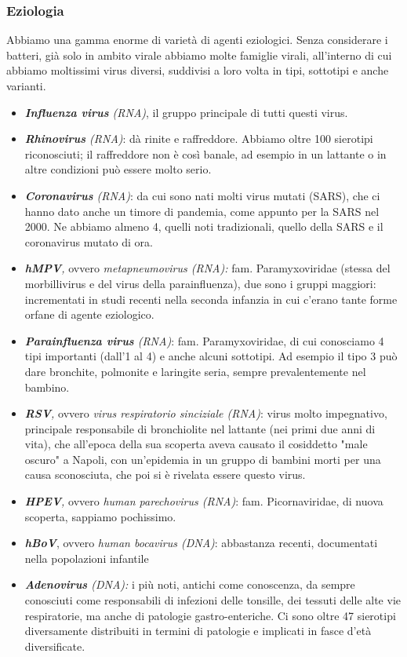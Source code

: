 \subsubsection{Eziologia}

  Abbiamo una gamma enorme di varietà di agenti eziologici. Senza
  considerare i batteri, già solo in ambito virale abbiamo molte
  famiglie virali, all'interno di cui abbiamo moltissimi virus diversi,
  suddivisi a loro volta in tipi, sottotipi e anche varianti.

\begin{itemize}
\item
  \emph{\textbf{Influenza virus} (RNA)}, il gruppo principale di tutti
  questi virus.
\item
  \emph{\textbf{Rhinovirus} (RNA)}: dà rinite e raffreddore. Abbiamo
  oltre 100 sierotipi riconosciuti; il raffreddore non è così banale, ad
  esempio in un lattante o in altre condizioni può essere molto serio.
\item
  \emph{\textbf{Coronavirus} (RNA)}: da cui sono nati molti virus mutati
  (SARS), che ci hanno dato anche un timore di pandemia, come appunto
  per la SARS nel 2000. Ne abbiamo almeno 4, quelli noti tradizionali,
  quello della SARS e il coronavirus mutato di ora.
\item
  \emph{\textbf{hMPV},} ovvero \emph{metapneumovirus (RNA):} fam.
  Paramyxoviridae (stessa del morbillivirus e del virus della
  parainfluenza), due sono i gruppi maggiori: incrementati in studi
  recenti nella seconda infanzia in cui c'erano tante forme orfane di
  agente eziologico.
\item
  \emph{\textbf{Parainfluenza virus} (RNA)}: fam. Paramyxoviridae, di
  cui conosciamo 4 tipi importanti (dall'1 al 4) e anche alcuni
  sottotipi. Ad esempio il tipo 3 può dare bronchite, polmonite e
  laringite seria, sempre prevalentemente nel bambino.
\item
  \emph{\textbf{RSV},} ovvero \emph{virus respiratorio sinciziale
  (RNA)}: virus molto impegnativo, principale responsabile di
  bronchiolite nel lattante (nei primi due anni di vita), che all'epoca
  della sua scoperta aveva causato il cosiddetto "male oscuro" a Napoli,
  con un'epidemia in un gruppo di bambini morti per una causa
  sconosciuta, che poi si è rivelata essere questo virus.
\item
  \emph{\textbf{HPEV},} ovvero \emph{human parechovirus (RNA)}: fam.
  Picornaviridae, di nuova scoperta, sappiamo pochissimo.
\item
  \emph{\textbf{hBoV}}, ovvero \emph{human bocavirus (DNA)}: abbastanza
  recenti, documentati nella popolazioni infantile
\item
  \emph{\textbf{Adenovirus} (DNA):} i più noti, antichi come conoscenza,
  da sempre conosciuti come responsabili di infezioni delle tonsille,
  dei tessuti delle alte vie respiratorie, ma anche di patologie
  gastro-enteriche. Ci sono oltre 47 sierotipi diversamente distribuiti
  in termini di patologie e implicati in fasce d'età diversificate.
\end{itemize}
